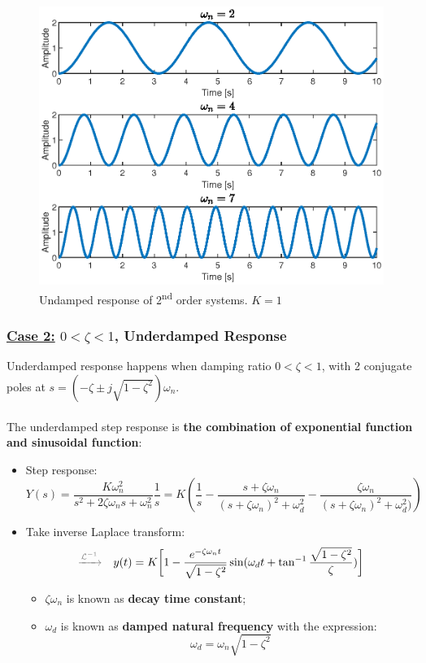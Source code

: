 \begin{figure}[H] 
    \centering 
    \includegraphics[width=.8\textwidth]{images/undamped_response.eps}
    \caption{Undamped response of 2\textsuperscript{nd} order systems. $K=1$}
\end{figure}

\subsubsection{\underline{Case 2:} $0<\zeta<1$, Underdamped Response}
Underdamped response happens when damping ratio $0<\zeta<1$, with 2 conjugate poles at $s = (-\zeta\pm j \sqrt{1-\zeta^{2}})\omega_{n}$.\\\\
The underdamped step response is \textbf{the combination of exponential function and sinusoidal function}:
\begin{itemize}
    \item Step response: 
    \[
    Y(s) = \frac{K\omega_{n}^{2}}{s^{2}	+2\zeta\omega_{n}s+\omega_{n}^{2}} \frac{1}{s} = K(\frac{1}{s}-\frac{s+\zeta\omega_{n}}{(s+\zeta\omega_{n})^{2}+\omega_{d}^{2}}-\frac{\zeta\omega_{n}}{(s+\zeta\omega_{n})^{2}+\omega_{d}^{2})})
    \]
    
    \item Take inverse Laplace transform:
    \[ {\color{gray}\xrightarrow{\mathcal{L}^{-1}}} \quad
    y(t) = K \bigg[ 1-\frac{e^{-\zeta\omega_{n} t}}{\sqrt{1-\zeta^{2}}} \sin(\omega_{d}t +\tan^{-1}\frac{\sqrt{1-\zeta^{2}}}{\zeta}) \bigg] 
    \]
    \begin{itemize}
        \item $\zeta\omega_{n}$ is known as \textbf{decay time constant};
        
        \item $\omega_{d}$ is known as \textbf{damped natural frequency} with the expression:
        \[\omega_{d} = \omega_{n}\sqrt{1-\zeta^{2}}\]
    \end{itemize}
\end{itemize}

